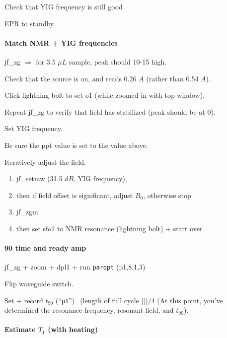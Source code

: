 \begin{scriptsize}
\begin{python}[off]
Check that YIG frequency is still good

EPR to standby.


\paragraph{ Match NMR + YIG frequencies}
jf\_zg $\Rightarrow$ for 3.5 $\mu L$ sample, peak should 10-15 high.

Check that the source is on, and reads 0.26 $A$ (rather than 0.54 $A$).

Click lightning bolt to set o1 (while zoomed in with top window).

Repeat jf\_zg to verify that field has stabilized (peak should be at 0).

Set YIG frequency.

Be sure the ppt value is set to the value above.

Iteratively adjust the field.
{\small
\begin{enumerate}
	\item jf\_setmw (31.5 $dB$, YIG frequency),
	\item then if field offset is significant, adjust $B_0$, otherwise stop
	\item jf\_zgm
	\item then set sfo1 to NMR resonance (lightning bolt) + start over
\end{enumerate}
}

\paragraph{90 time and ready amp}
jf\_zg + zoom + dpl1 + run {\tt paropt} (p1,8,1,3)

Flip waveguide switch.

Set + record $t_{90}$ (``\texttt{p1}'')=(length of full cycle [\us])/4 (At this point, you've determined the resonance frequency, resonant field, and $t_{90}$).

\paragraph{Estimate $T_1$ (with heating)}


\end{python}
\end{scriptsize}
